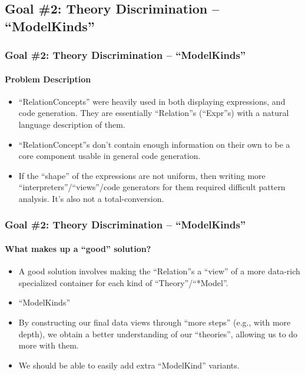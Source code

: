 \documentclass{beamer}
\begin{document}
\subsection{Goal \#2: Theory Discrimination -- ``ModelKinds''}

\begin{frame}
    \frametitle{Goal \#2: Theory Discrimination -- ``ModelKinds''}
    \framesubtitle{Problem Description}
    
    \begin{itemize}
        \item<2-> ``RelationConcepts'' were heavily used in both displaying expressions, and code generation. They are essentially ``Relation''s (``Expr''s) with a natural language description of them.
        \item<3-> ``RelationConcept''s don't contain enough information on their own to be a core component usable in general code generation.
        \item<4-> If the ``shape'' of the expressions are not uniform, then writing more ``interpreters''/``views''/code generators for them required difficult pattern analysis. It's also not a total-conversion.
    \end{itemize}
\end{frame}

\begin{frame}
    \frametitle{Goal \#2: Theory Discrimination -- ``ModelKinds''}
    \framesubtitle{What makes up a ``good'' solution?}
    
    \begin{itemize}
        \item<2-> A good solution involves making the ``Relation''s a ``view'' of a more data-rich specialized container for each kind of ``Theory''/``*Model''.
        \item<3-> ``ModelKinds''
        \item<4-> By constructing our final data views through ``more steps'' (e.g., with more depth), we obtain a better understanding of our ``theories'', allowing us to do more with them.
        \item<5-> We should be able to easily add extra ``ModelKind'' variants.
    \end{itemize}
\end{frame}
\end{document}
